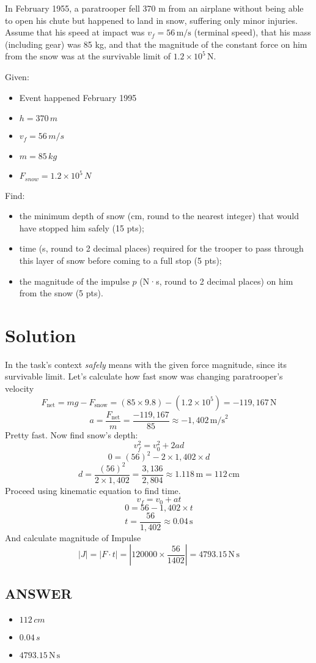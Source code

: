 In February 1955, a paratrooper fell 370 m from an airplane without being able to open his chute but happened to land in snow, suffering only minor injuries. Assume that his speed at impact was \( v_f = 56 \, \text{m/s} \) (terminal speed), that his mass (including gear) was 85 kg, and that the magnitude of the constant force on him from the snow was at the survivable limit of \( 1.2 \times 10^5 \, \text{N} \).

\bigbreak Given:
\begin{itemize}
    \item Event happened February 1995
    \item $ h = 370 \,m$
    \item $v_f = 56 \, m/s$
    \item $m = 85 \, kg$
    \item $F_{snow} = 1.2 \times 10^5 \, N$
\end{itemize}

\bigbreak Find:
\begin{itemize}
    \item the minimum depth of snow (cm, round to the nearest integer) that would have stopped him safely (15 pts);
    \item time (s, round to 2 decimal places) required for the trooper to pass through this layer of snow before coming to a full stop (5 pts);
    \item the magnitude of the impulse \( p \) (N·s, round to 2 decimal places) on him from the snow (5 pts).
\end{itemize}

\section*{Solution}
In the task's context \textit{safely} means with the given force magnitude,
since its survivable limit. Let's calculate how fast snow was changing paratrooper's velocity
$$
F_{\text{net}} = m g - F_{\text{snow}} = (85 \times 9.8) - (1.2 \times 10^5) = - 119,167 \, \text{N}
$$
\[
a = \frac{F_{\text{net}}}{m} = \frac{-119,167}{85} \approx -1,402 \, \text{m/s}^2
\]
Pretty fast. Now find snow's depth:
    \[
    v_f^2 = v_0^2 + 2 a d
    \]
    \[
    0 = (56)^2 - 2 \times 1,402 \times d
    \]
    \[
    d = \frac{(56)^2}{2 \times 1,402} = \frac{3,136}{2,804} \approx 1.118 \, \text{m} = \boxed{112 \, \text{cm}}
    \]
Proceed using kinematic equation to find time.
    \[
    v_f = v_0 + a t
    \]
    \[
    0 = 56 - 1,402 \times t
    \]
    \[
    t = \frac{56}{1,402} \approx \boxed{0.04 \, \text{s}}
    \]
And calculate magnitude of Impulse
\[
|J| = |F \cdot t| = |120000 \times \frac{56}{1402}| = \boxed{4793.15 \, \text{N}\, \text{s}}
\]

\vfill \subsection*{ANSWER}
\begin{itemize}
    \item $ 112 \, c m$
    \item $0.04\,s$ 
    \item $4793.15 \, \text{N}\, \text{s}$
\end{itemize}
